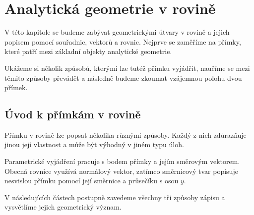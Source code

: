 \section{Analytická geometrie v rovině}
\label{sec:Analytic_geometry_plane}

V této kapitole se budeme zabývat geometrickými útvary v rovině
a jejich popisem pomocí souřadnic, vektorů a rovnic. Nejprve se
zaměříme na přímky, které patří mezi základní objekty analytické
geometrie.

Ukážeme si několik způsobů, kterými lze tutéž přímku vyjádřit,
naučíme se mezi těmito způsoby převádět a následně budeme zkoumat
vzájemnou polohu dvou přímek.

\subsection{Úvod k přímkám v rovině}
\label{subsec:Lines_in_plane}

Přímku v rovině lze popsat několika různými způsoby. Každý z nich
zdůrazňuje jinou její vlastnost a může být výhodný v jiném typu úloh.

Parametrické vyjádření pracuje s bodem přímky a jejím směrovým
vektorem. Obecná rovnice využívá normálový vektor, zatímco směrnicový
tvar popisuje nesvislou přímku pomocí její směrnice a průsečíku
s osou $y$.

V následujících částech postupně zavedeme všechny tři způsoby zápisu
a vysvětlíme jejich geometrický význam.







